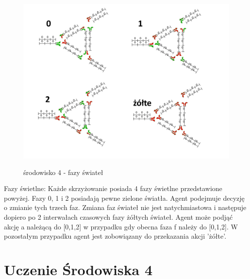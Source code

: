 \documentclass[12pt]{book}
\theoremstyle{plain}
\begin{document}
	
	\begin{figure}[H]
		\centering
		\includegraphics[width=14cm]{env_4_fazy}
		\label{fig:env_4_fazy}
		\caption{środowisko 4 - fazy świateł}
	\end{figure}
	Fazy świetlne: Każde skrzyżowanie posiada 4 fazy świetlne przedstawione powyżej. Fazy 0, 1 i 2 posiadają pewne zielone światła. Agent podejmuje decyzję o zmianie tych trzech faz. Zmiana faz świateł nie jest natychmiastowa i następuje dopiero po 2 interwałach czasowych fazy żółtych świateł. Agent może podjąć akcję a należącą do
	[0,1,2] w przypadku gdy obecna faza f należy do [0,1,2]. W pozostałym przypadku agent jest zobowiązany do przekazania akcji 'żółte'.
	
	\section{Uczenie Środowiska 4}	
\end{document}
